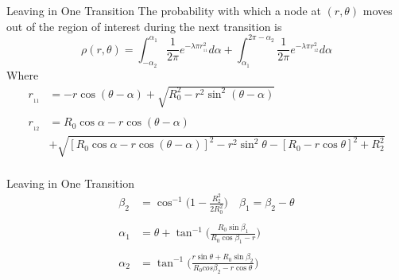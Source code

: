 \documentclass{beamer}
\begin{document}
\begin{frame}{Leaving in One Transition} 
The probability with which a 
node at $(r,\theta)$ moves out of the region of interest during the next transition is 
\begin{equation*} 
	\rho(r,\theta) = \int_{-\alpha_2}^{\alpha_1} \frac{1}{2\pi} e^{-\lambda \pi r_{\!_{11}}^2} d\alpha +  \int^{2\pi-\alpha_2}_{\alpha_1} \frac{1}{2\pi} e^{-\lambda \pi r_{\!_{12}}^2} d\alpha
\end{equation*}
Where
\begin{align*}
	r_{\!_{11}} &= -r\cos(\theta -\alpha) + \sqrt{R_0^2 - r^2\sin^2(\theta - \alpha)} \\
	&\\
	r_{\!_{12}} &= R_0 \cos \alpha - r\cos(\theta - \alpha)  \\&+  \sqrt{[R_0 \cos \alpha - r\cos(\theta-\alpha) ]^2 - r^2\sin^2 \theta - [R_0 - r\cos \theta]^2 + R_2^2} \\
\end{align*}
\end{frame}



\begin{frame}{Leaving in One Transition}{}
\begin{align*}
        \beta_2 &= \cos^{-1}\bigg(1-\frac{R_2^2}{2R_0^2}\bigg) 
	\quad
	\beta_1 = \beta_2 - \theta \\
	&\\
	\alpha_1 &= \theta + \tan^{-1}\bigg( \frac{R_0\sin\beta_1}{R_0\cos\beta_1-r}\bigg)\\
			& \\
        \alpha_2 &= \tan^{-1}\bigg( \frac{r\sin\theta + R_0\sin\beta_2}{R_0cos\beta_2 - r\cos\theta} \bigg)
\end{align*}
\end{frame}
\end{document}
